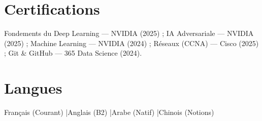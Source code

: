 \documentclass[a4paper,9pt]{article}
\begin{document}
\section{Certifications}
Fondements du Deep Learning --- NVIDIA (2025) ; IA Adversariale --- NVIDIA (2025) ; Machine Learning --- NVIDIA (2024) ; Réseaux (CCNA) --- Cisco (2025) ; Git \& GitHub --- 365 Data Science (2024).
\section{Langues}
Français (Courant) \quad|\quad Anglais (B2) \quad|\quad Arabe (Natif) \quad|\quad Chinois (Notions)
\end{document}
